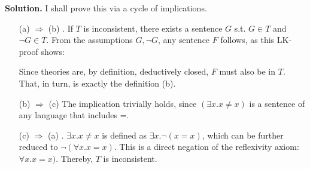 \begin{enumerate}
	\textbf{Solution.} I shall prove this via a cycle of implications.
	
	\begin{enumerate}
		\item[(a) $\Rightarrow$ (b)]. If $T$ is inconsistent, there exists a sentence $G$ s.t. $G \in T$ and $\neg G \in T$. From the assumptions $G,\neg G$, any sentence $F$ follows, as this LK-proof shows:
		
		\begin{prooftree}
		\end{prooftree}
		
		Since theories are, by definition, deductively closed, $F$ must also be in $T$. That, in turn, is exactly the definition (b).
		
		\item[(b) $\Rightarrow$ (c)] The implication trivially holds, since $(\exists x. x \neq x)$ is a sentence of any language that includes =.
		
		\item[(c) $\Rightarrow$ (a)]. $\exists x. x \neq x$ is defined as $\exists x. \neg (x = x)$, which can be further reduced to $\neg (\forall x. x = x)$. This is a direct negation of the reflexivity axiom: $\forall x. x = x)$. Thereby, $T$ is inconsistent.
	\end{enumerate}
\end{enumerate}

